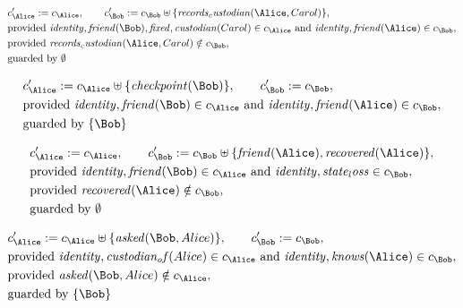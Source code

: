 \begin{align*}
&
c'_
{
\Alice
}
 := 
c_
{
\Alice
}
, \qquad 
c'_
{
\Bob
}
 := 
c_
{
\Bob
}
 \uplus 
\{
\mathit{
records_custodian
}
(
\Alice
,
Carol
)
\}
,\\
&
\text{provided } 
\mathit{
identity
}
,
\mathit{
friend
}
(
\Bob
)
,
\mathit{
fixed
}
,
\mathit{
custodian
}
(
Carol
)
 \in c_
{
\Alice
}
 \text{ and } 
\mathit{
identity
}
,
\mathit{
friend
}
(
\Alice
)
 \in c_
{
\Bob
}
,\\
&
\text{provided } 
\mathit{
records_custodian
}
(
\Alice
,
Carol
)
 \notin c_
{
\Bob
}
,\\
&
\text{guarded by } \emptyset
\end{align*}

\begin{align*}
&
c'_
{
\Alice
}
 := 
c_
{
\Alice
}
 \uplus 
\{
\mathit{
checkpoint
}
(
\Bob
)
\}
, \qquad 
c'_
{
\Bob
}
 := 
c_
{
\Bob
}
,\\
&
\text{provided } 
\mathit{
identity
}
,
\mathit{
friend
}
(
\Bob
)
 \in c_
{
\Alice
}
 \text{ and } 
\mathit{
identity
}
,
\mathit{
friend
}
(
\Alice
)
 \in c_
{
\Bob
}
,\\
&
\text{guarded by } \{
\Bob
\}
\end{align*}

\begin{align*}
&
c'_
{
\Alice
}
 := 
c_
{
\Alice
}
, \qquad 
c'_
{
\Bob
}
 := 
c_
{
\Bob
}
 \uplus 
\{
\mathit{
friend
}
(
\Alice
)
,
\mathit{
recovered
}
(
\Alice
)
\}
,\\
&
\text{provided } 
\mathit{
identity
}
,
\mathit{
friend
}
(
\Bob
)
 \in c_
{
\Alice
}
 \text{ and } 
\mathit{
identity
}
,
\mathit{
state_loss
}
 \in c_
{
\Bob
}
,\\
&
\text{provided } 
\mathit{
recovered
}
(
\Alice
)
 \notin c_
{
\Bob
}
,\\
&
\text{guarded by } \emptyset
\end{align*}

\begin{align*}
&
c'_
{
\Alice
}
 := 
c_
{
\Alice
}
 \uplus 
\{
\mathit{
asked
}
(
\Bob
,
Alice
)
\}
, \qquad 
c'_
{
\Bob
}
 := 
c_
{
\Bob
}
,\\
&
\text{provided } 
\mathit{
identity
}
,
\mathit{
custodian_of
}
(
Alice
)
 \in c_
{
\Alice
}
 \text{ and } 
\mathit{
identity
}
,
\mathit{
knows
}
(
\Alice
)
 \in c_
{
\Bob
}
,\\
&
\text{provided } 
\mathit{
asked
}
(
\Bob
,
Alice
)
 \notin c_
{
\Alice
}
,\\
&
\text{guarded by } \{
\Bob
\}
\end{align*}
